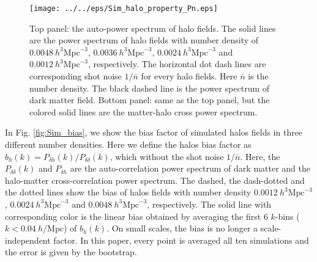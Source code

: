 \begin{figure}[tbp]
\begin{center}
\texttt{[image: ../../eps/Sim\_halo\_property\_Pn.eps]}
\end{center}
\caption{Top panel: the auto-power spectrum of halo fields. The 
solid lines are the power spectrum of halo fields with number density of
$0.0048\ h^{3}\mathrm{Mpc}^{-3}$, $0.0036\ h^{3}\mathrm{Mpc}^{-3}$, 
$0.0024\ h^{3}\mathrm{Mpc}^{-3}$ and $0.0012\ h^{3}\mathrm{Mpc}^{-3}$,
 respectively.
The horizontal dot dash lines are corresponding shot noise $1/\bar{n}$ 
for every halo fields. Here $\bar{n}$ is the number density.
The black dashed line is the power
spectrum of dark matter field.
Bottom panel: same as the top panel, but the colored solid lines are the 
matter-halo cross power spectrum.}
\label{fig:Sim_CC_Pn}
\end{figure}
In Fig. \ref{fig:Sim_bias}, we show the bias factor  
 of simulated halos fields in three different number densities. 
 Here we define the halos
 bias factor as $b_{h}(k)=P_{\delta h}(k)/P_{\delta\delta}(k)$,
 which without the shot noise $1/\bar{n}$.
 Here, the $P_{\delta \delta}(k)$ and $P_{\delta h}$ are the auto-correlation 
 power
 spectrum of dark matter and the halo-matter cross-correlation power spectrum. 
 The dashed, the dash-dotted and the dotted lines show the bias of halos
 fields with number density $0.0012\ h^{3}\mathrm{Mpc}^{-3}$,
 $0.0024\ h^{3}\mathrm{Mpc}^{-3}$ and $0.0048\ h^{3}\mathrm{Mpc}^{-3}$,
 respectively. The solid line with corresponding color is the linear bias
 obtained by averaging the first 6 $k$-bins ($k< 0.04\ h/\mathrm{Mpc}$)
 of $b_{h}(k)$.
 On small scales, the bias is no longer a scale-independent factor. 
 In this paper, every point is averaged all ten simulations and the error
 is given by the bootstrap.\\
 
